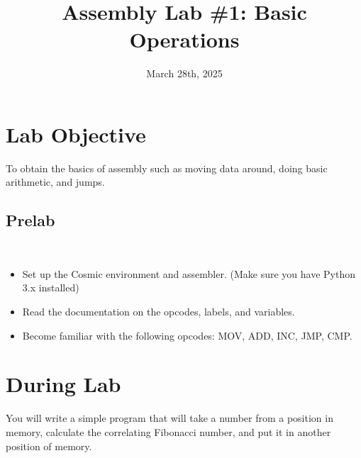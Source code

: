 \documentclass[
	12pt, %
]{fphw}
\title{Assembly Lab \#1: Basic Operations} %
\date{March 28th, 2025} %
\institute{Elizabethtown College \\ Department of Computer Science} %
\begin{document}
\maketitle %


\section*{Lab Objective}

\begin{problem}
	To obtain the basics of assembly such as moving data around, doing basic arithmetic, and jumps. 
\end{problem}


\subsection*{Prelab}\\

\begin{itemize}
  \item Set up the Cosmic environment and assembler. (Make sure you have Python 3.x installed)
  \item Read the documentation on the opcodes, labels, and variables.
  \item Become familiar with the following opcodes: MOV, ADD, INC, JMP, CMP.
\end{itemize}


\section*{During Lab}

\begin{problem}
	You will write a simple program that will take a number from a position in memory, calculate the correlating Fibonacci number, and put it in another position of memory. 
\end{problem}

\end{document}

